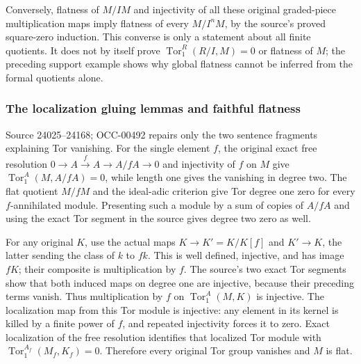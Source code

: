 Conversely, flatness of \(M/IM\) and injectivity of all these original graded-piece multiplication maps imply flatness of every \(M/I^nM\), by the source's proved square-zero induction. This converse is only a statement about all finite quotients. It does not by itself prove \(\operatorname{Tor}_1^R(R/I,M)=0\) or flatness of \(M\); the preceding support example shows why global flatness cannot be inferred from the formal quotients alone.

\subsubsection{The localization gluing lemmas and faithful flatness}\label{the-localization-gluing-lemmas-and-faithful-flatness}

Source 24025--24168; OCC-00492 repairs only the two sentence fragments explaining Tor vanishing. For the single element \(f\), the original exact free resolution \(0\to A\xrightarrow{f}A\to A/fA\to0\) and injectivity of \(f\) on \(M\) give \(\operatorname{Tor}_1^A(M,A/fA)=0\), while length one gives the vanishing in degree two. The flat quotient \(M/fM\) and the ideal-adic criterion give Tor degree one zero for every \(f\)-annihilated module. Presenting such a module by a sum of copies of \(A/fA\) and using the exact Tor segment in the source gives degree two zero as well.

For any original \(K\), use the actual maps \(K\to K'=K/K[f]\) and \(K'\to K\), the latter sending the class of \(k\) to \(fk\). This is well defined, injective, and has image \(fK\); their composite is multiplication by \(f\). The source's two exact Tor segments show that both induced maps on degree one are injective, because their preceding terms vanish. Thus multiplication by \(f\) on \(\operatorname{Tor}_1^A(M,K)\) is injective. The localization map from this Tor module is injective: any element in its kernel is killed by a finite power of \(f\), and repeated injectivity forces it to zero. Exact localization of the free resolution identifies that localized Tor module with \(\operatorname{Tor}_1^{A_f}(M_f,K_f)=0\). Therefore every original Tor group vanishes and \(M\) is flat.

